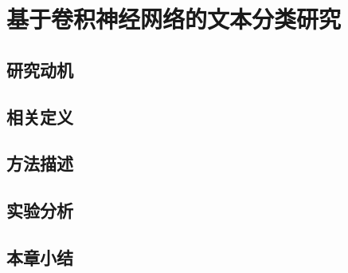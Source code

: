 \chapter{基于卷积神经网络的文本分类研究}

\section{研究动机}

\section{相关定义}

\section{方法描述}

\section{实验分析}

\section{本章小结}